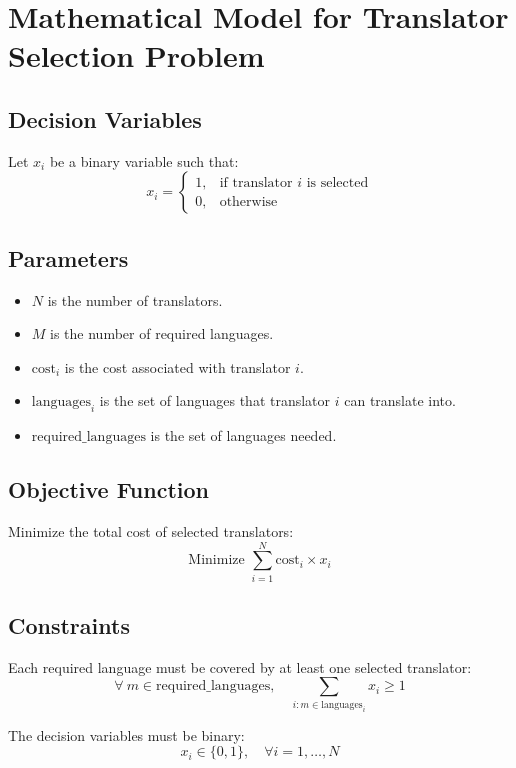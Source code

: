 \documentclass{article}
\begin{document}
\section*{Mathematical Model for Translator Selection Problem}

\subsection*{Decision Variables}
Let \( x_i \) be a binary variable such that:
\[
x_i = 
\begin{cases} 
1, & \text{if translator } i \text{ is selected} \\
0, & \text{otherwise}
\end{cases}
\]

\subsection*{Parameters}
\begin{itemize}
    \item \( N \) is the number of translators.
    \item \( M \) is the number of required languages.
    \item \( \text{cost}_i \) is the cost associated with translator \( i \).
    \item \( \text{languages}_i \) is the set of languages that translator \( i \) can translate into.
    \item \( \text{required\_languages} \) is the set of languages needed.
\end{itemize}

\subsection*{Objective Function}
Minimize the total cost of selected translators:
\[
\text{Minimize } \sum_{i=1}^{N} \text{cost}_i \times x_i
\]

\subsection*{Constraints}
Each required language must be covered by at least one selected translator:
\[
\forall \ m \in \text{required\_languages}, \quad \sum_{i: m \in \text{languages}_i} x_i \geq 1
\]

The decision variables must be binary:
\[
x_i \in \{0, 1\}, \quad \forall i = 1, \dots, N
\]
\end{document}

